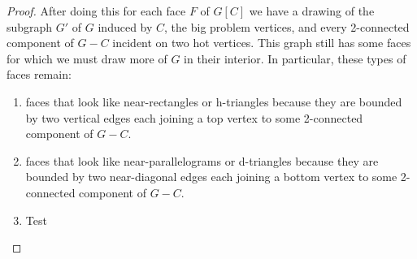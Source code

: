 \documentclass{patmorin}
\begin{document}
\begin{proof}
  After doing this for each face $F$ of $G[C]$ we have a drawing of the
  subgraph $G'$ of $G$ induced by $C$, the big problem vertices, and every
  2-connected component of $G-C$ incident on two hot vertices.  This graph
  still has some faces for which we must draw more of $G$ in their interior.
  In particular, these types of faces remain:
  \begin{enumerate}
     \item faces that look like near-rectangles or h-triangles because they are bounded by two vertical edges each joining a top vertex to some 2-connected component of $G-C$.
     \item faces that look like near-parallelograms or d-triangles because they are bounded by two near-diagonal edges each joining a bottom vertex to some 2-connected component of $G-C$.
     \item Test  
  \end{enumerate}

\end{proof}
\end{document}
